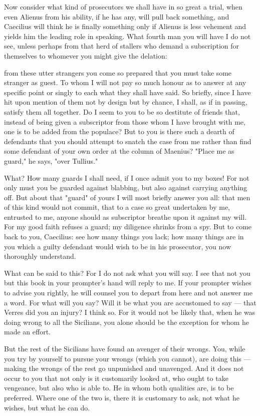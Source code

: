  Now consider what kind of prosecutors we shall have in so great a trial, when even Alienus from his ability, if he has any, will pull back something, and Caecilius will think he is finally something only if Alienus is less vehement and yields him the leading role in speaking. What fourth man you will have I do not see, unless perhaps from that herd of stallers who demand a subscription for themselves to whomever you might give the delation:

 from these utter strangers you come so prepared that you must take some stranger as guest. To whom I will not pay so much honour as to answer at any specific point or singly to each what they shall have said. So briefly, since I have hit upon mention of them not by design but by chance, I shall, as if in passing, satisfy them all together. Do I seem to you to be so destitute of friends that, instead of being given a subscriptor from those whom I have brought with me, one is to be added from the populace? But to you is there such a dearth of defendants that you should attempt to snatch the case from me rather than find some defendant of your own order at the column of Maenius? "Place me as guard," he says, "over Tullius."

 What? How many guards I shall need, if I once admit you to my boxes! For not only must you be guarded against blabbing, but also against carrying anything off. But about that "guard" of yours I will most briefly answer you all: that men of this kind would not commit, that to a case so great undertaken by me, entrusted to me, anyone should as subscriptor breathe upon it against my will. For my good faith refuses a guard; my diligence shrinks from a spy. But to come back to you, Caecilius: see how many things you lack; how many things are in you which a guilty defendant would wish to be in his prosecutor, you now thoroughly understand.

 What can be said to this? For I do not ask what you will say. I see that not you but this book in your prompter's hand will reply to me. If your prompter wishes to advise you rightly, he will counsel you to depart from here and not answer me a word. For what will you say? Will it be what you are accustomed to say --- that Verres did you an injury? I think so. For it would not be likely that, when he was doing wrong to all the Sicilians, you alone should be the exception for whom he made an effort.

 But the rest of the Sicilians have found an avenger of their wrongs. You, while you try by yourself to pursue your wrongs (which you cannot), are doing this --- making the wrongs of the rest go unpunished and unavenged. And it does not occur to you that not only is it customarily looked at, who ought to take vengeance, but also who is able to. He in whom both qualities are, is to be preferred. Where one of the two is, there it is customary to ask, not what he wishes, but what he can do.

